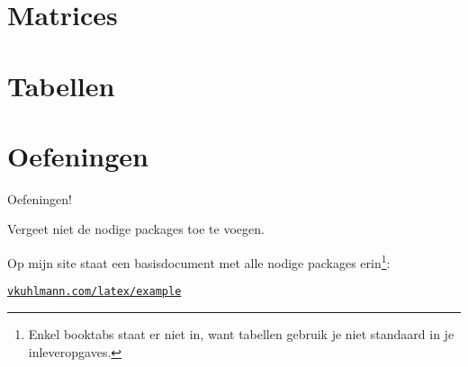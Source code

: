 \documentclass[
    dutch,
    everyoneauthor=true,
    darktheme,
    defaultSlideCollection=vincent,
    handout
]{../../cursuspresentatie}
\let\placetarget\relax
\let\placetarget\relax
\begin{document}
\def\placetarget{\hypertarget{figuren}{}}


\section{Matrices}\label{sec:matrices}

\def\placetarget{\hypertarget{matrices}{}}



\section{Tabellen}\label{sec:tabellen}

\def\placetarget{\hypertarget{tabellen}{}}



\section{Oefeningen}\label{sec:oefeningen2}

\def\placetarget{\hypertarget{oefeningen2}{}}

\begin{frame}
    \begin{center}
        {\LARGE Oefeningen!}
        \vspace{30pt}

        Vergeet niet de nodige packages toe te voegen.
        
        Op mijn site
        staat een basisdocument met alle nodige packages erin\footnote{Enkel
        booktabs staat er niet in, want tabellen gebruik je niet standaard in je
        inleveropgaves.}:

        \href{https://vkuhlmann.com/latex/example}{\nolinkurl{vkuhlmann.com/latex/example}}
    \end{center}
\end{frame}
\end{document}
